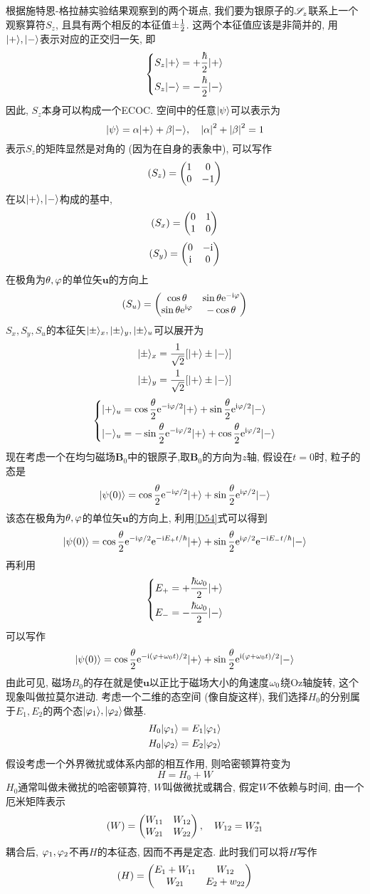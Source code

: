 \documentclass[UTF8]{ctexart}
\numberwithin{equation}{subsection}
\begin{document}
根据施特恩-格拉赫实验结果观察到的两个斑点, 我们要为银原子的$\cm{S}_z$联系上一个观察算符$S_z$, 且具有两个相反的本征值$\pm\ff{2}$. 这两个本征值应该是非简并的, 用$\kt{+}, \kt{-}$表示对应的正交归一矢, 即
$$\hua{
    S_z\kt{+} \x +\f{\hbar}{2}\kt{+}\\
    S_z\kt{-} \x -\f{\hbar}{2}\kt{-}
}$$
因此, $S_z$本身可以构成一个ECOC. 空间中的任意$\kt\psi$可以表示为
$$\kt\psi=\a\kt{+}+\b\kt{-},\quad \abs{\a}^2+\abs{\b}^2=1$$
表示$S_z$的矩阵显然是对角的 (因为在自身的表象中), 可以写作
$$(S_z)=\bmat{1}{0}{0}{-1}$$
在以$\kt{+},\kt{-}$构成的基中,
$$(S_x)=\bmat{0}{1}{1}{0}$$
$$(S_y)=\bmat{0}{-\i}{\i}{0}$$
在极角为$\t,\vp$的单位矢$\bm{u}$的方向上
$$(S_u)=\bmat{\cos\t}{\sin\t \e^{-{\i\vp}}}{\sin\t \e^{\i\vp}}{-\cos\t}$$
$S_x,S_y,S_u$的本征矢$\kt{\pm}_x,\kt{\pm}_y,\kt{\pm}_u$可以展开为
$$\ar{
    \kt{\pm}_x \x \ff{\s2}[\kt{+}\pm\kt{-}]\\
    \kt{\pm}_y \x \ff{\s2}[\kt{+}\pm\kt{-}]
}$$
$$\hua{
    \kt{+}_u \x \cos\f{\t}{2}\e^{-\i\vp/2}\kt{+}+\sin\f{\t}{2}\e^{\i\vp/2}\kt{-}\\
    \kt{-}_u \x -\sin\f{\t}{2}\e^{-\i\vp/2}\kt{+}+\cos\f{\t}{2}\e^{\i\vp/2}\kt{-}
}$$
现在考虑一个在均匀磁场$\bm{B}_0$中的银原子,取$\bm{B}_0$的方向为$z$轴, 假设在$t=0$时, 粒子的态是
$$\kt{\psi(0)}=\cos\f{\t}{2}\e^{-\i\vp/2}\kt{+}+\sin\f{\t}{2}\e^{\i\vp/2}\kt{-}$$
该态在极角为$\t,\vp$的单位矢$\bm{u}$的方向上, 利用\ref{D54}式可以得到
$$\kt{\psi(0)}=\cos\f{\t}{2}\e^{-\i\vp/2}\e^{-\i E_+t/\hbar}\kt{+}+\sin\f{\t}{2}\e^{\i\vp/2}\e^{-\i E_-t/\hbar}\kt{-}$$
再利用
$$\hua{
    E_+=+\f{\hbar\o_0}{2}\kt{+}\\
    E_-=-\f{\hbar\o_0}{2}\kt{-}
}$$
可以写作
$$\kt{\psi(0)}=\cos\f{\t}{2}\e^{-\i(\vp+\o_0t)/2}\kt{+}+\sin\f{\t}{2}\e^{\i(\vp+\o_0t)/2}\kt{-}$$
由此可见, 磁场$B_0$的存在就是使$\bm{u}$以正比于磁场大小的角速度$\o_0$绕Oz轴旋转, 这个现象叫做拉莫尔进动.
考虑一个二维的态空间 (像自旋这样), 我们选择$H_0$的分别属于$E_1,E_2$的两个态$\kt{\vp_1},\kt{\vp_2}$做基. 
$$\ar{
    H_0\kt{\vp_1} \x E_1\kt{\vp_1}\\
    H_0\kt{\vp_2} \x E_2\kt{\vp_2}
}$$
假设考虑一个外界微扰或体系内部的相互作用, 则哈密顿算符变为
$$H=H_0+W$$
$H_0$通常叫做未微扰的哈密顿算符, $W$叫做微扰或耦合, 假定$W$不依赖与时间, 由一个厄米矩阵表示
$$(W)=\bmat{W_{11}}{W_{12}}{W_{21}}{W_{22}},\quad W_{12}=W_{21}^*$$
耦合后, $\vp_1, \vp_2$不再$H$的本征态, 因而不再是定态. 此时我们可以将$H$写作
$$(H)=\bmat{E_1+W_{11}}{W_{12}}{W_{21}}{E_2+w_{22}}$$
\end{document}

